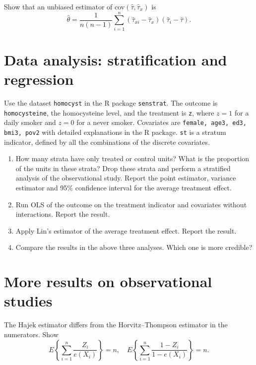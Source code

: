 \documentclass[11pt]{article}
\theoremstyle{definition}
\begin{document}
Show that an unbiased estimator of cov$(\hat{\tau} ,\hat{\tau}_{x} )$ is
$$
\hat{\theta} = \frac{1}{n(n-1)} \sum_{i=1}^n (\hat{\tau}_{xi} - \hat{\tau}_{x})  (  \hat{\tau}_i- \hat{\tau} ).
$$



\section{Data analysis: stratification and regression}

Use the dataset \texttt{homocyst} in the R package \texttt{senstrat}. 
The outcome is \texttt{homocysteine}, the homocysteine level, and the treatment is \texttt{z}, where $z=1$ for a daily smoker and $z=0$ for a never smoker. Covariates are \texttt{female, age3, ed3, bmi3, pov2} with detailed explanations in the R package. \texttt{st} is a stratum indicator, defined by all the combinations of the discrete covariates.


\begin{enumerate}
[(1)]
\item
How many strata have only treated or control units? What is the proportion of the units in these strata? Drop these strata and perform a stratified analysis of the observational study. Report the point estimator, variance estimator and 95\% confidence interval for the average treatment effect.

\item
Run OLS of the outcome on the treatment indicator and covariates without interactions. Report the result.

\item
Apply Lin's estimator of the average treatment effect. Report the result. 


\item
Compare the results in the above three analyses. Which one is more credible?

\end{enumerate}






\section{More results on observational studies}


 
The Hajek estimator differs from the Horvitz--Thompson estimator in the numerators. Show
$$
E\left\{  \sum_{i=1}^n  \frac{Z_i}{e(X_i)} \right\} = n,\quad
E\left\{  \sum_{i=1}^n  \frac{1-Z_i}{1-e(X_i)} \right\} = n .
$$
 
\end{document}
